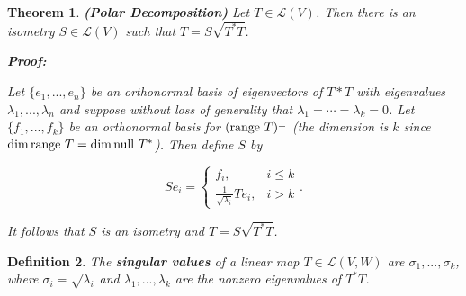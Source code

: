 \documentclass{article}
\theoremstyle{colontheorem}
\newtheorem{theorem}{Theorem}[section]
\newtheorem{definition}[theorem]{Definition}
\newcommand{\Null}{\textnormal{null }}
\newcommand{\Range}{\textnormal{range }}
\newenvironment{Theorem}
{
	\begin{mdframed}[backgroundcolor=TheoremOrange!10]
	\begin{theorem}
}
{
	\end{theorem}
	\end{mdframed}
	
	\vspace{.15in}
}
\newenvironment{Def}
{
	\begin{mdframed}[backgroundcolor=DefGreen!10]
	\begin{definition}
}
{
	\end{definition}
	\end{mdframed}
	
	\vspace{.15in}
}
\newenvironment{Proof}
{
	\begin{mdframed}[backgroundcolor=ProofPurple!10]
	\textbf{Proof:}%
}
{
	\end{mdframed}
	
	\vspace{.085in}
}
\begin{document}
\begin{Theorem}
	
	\textbf{(Polar Decomposition)} Let $T \in \mathcal{L}(V)$. Then there is an isometry $S \in \mathcal{L}(V)$ such that $T = S\sqrt{T^* T}$.
	
	\begin{Proof}
		Let $\{e_1, ..., e_n\}$ be an orthonormal basis of eigenvectors of $T*T$ with eigenvalues $\lambda_1, ..., \lambda_n$ and suppose without loss of generality that $\lambda_1 = \cdots = \lambda_k = 0$. Let $\{f_1, ..., f_k\}$ be an orthonormal basis for $(\Range T)^\perp$ (the dimension is $k$ since $\dim \Range T = \dim \Null T^*$). Then define $S$ by
		
		$$
			Se_i = \begin{cases} 
				f_i, & i \leq k \\
				\frac{1}{\sqrt{\lambda_i}}Te_i, & i > k
			\end{cases}.
		$$
		
		It follows that $S$ is an isometry and $T = S \sqrt{T^* T}$.
		
	\end{Proof}
	
\end{Theorem}



\begin{Def}
	
	The \textbf{singular values} of a linear map $T \in \mathcal{L}(V, W)$ are $\sigma_1, ..., \sigma_k$, where $\sigma_i = \sqrt{\lambda_i}$ and $\lambda_1, ..., \lambda_k$ are the nonzero eigenvalues of $T^* T$.
	
\end{Def}
\end{document}
